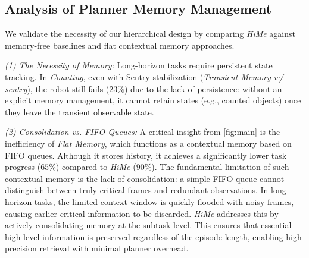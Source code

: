 \subsection{Analysis of Planner Memory Management}
\label{sec:memory}
We validate the necessity of our hierarchical design by comparing \textit{HiMe} against memory-free baselines and flat contextual memory approaches.

\textit{(1) The Necessity of Memory:}
Long-horizon tasks require persistent state tracking. In \textit{Counting}, even with Sentry stabilization (\textit{Transient Memory w/ sentry}), the robot still fails ($23\%$) due to the lack of persistence: without an explicit memory management, it cannot retain states (e.g., counted objects) once they leave the transient observable state.

\textit{(2) Consolidation vs. FIFO Queues:}
A critical insight from \autoref{fig:main} is the inefficiency of \textit{Flat Memory}, which functions as a contextual memory based on FIFO queues. Although it stores history, it achieves a significantly lower task progress ($65\%$) compared to \textit{HiMe} ($90\%$).
The fundamental limitation of such contextual memory is the lack of consolidation: a simple FIFO queue cannot distinguish between truly critical frames and redundant observations.
In long-horizon tasks, the limited context window is quickly flooded with noisy frames, causing earlier critical information to be discarded. \textit{HiMe} addresses this by actively consolidating memory at the subtask level. This ensures that essential high-level information is preserved regardless of the episode length, enabling high-precision retrieval with minimal planner overhead. 



